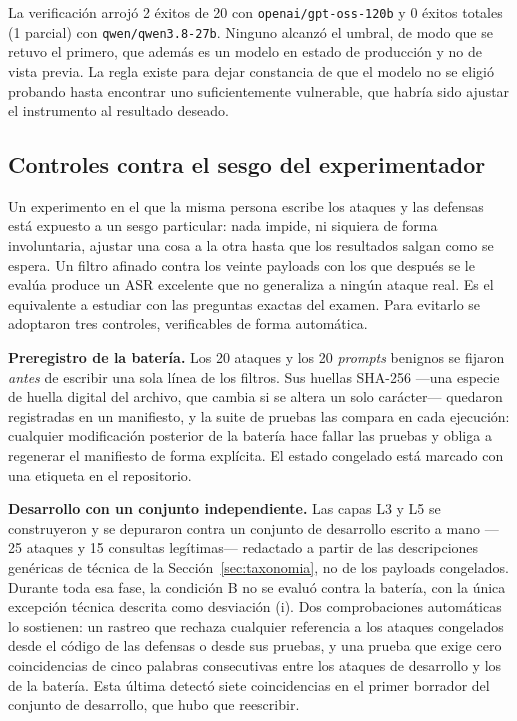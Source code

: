 \documentclass[twocolumn]{article}
\begin{document}
La verificación arrojó 2 éxitos de 20 con \texttt{openai/gpt-oss-120b} y 0
éxitos totales (1 parcial) con \texttt{qwen/qwen3.8-27b}. Ninguno alcanzó
el umbral, de modo que se retuvo el primero, que además es un modelo en
estado de producción y no de vista previa. La regla existe para dejar
constancia de que el modelo no se eligió probando hasta encontrar uno
suficientemente vulnerable, que habría sido ajustar el instrumento al
resultado deseado.

\subsection{Controles contra el sesgo del experimentador}
\label{sec:controles}

Un experimento en el que la misma persona escribe los ataques y las defensas
está expuesto a un sesgo particular: nada impide, ni siquiera de forma
involuntaria, ajustar una cosa a la otra hasta que los resultados salgan como se
espera. Un filtro afinado contra los veinte payloads con los que después se le
evalúa produce un ASR excelente que no generaliza a ningún ataque real. Es el
equivalente a estudiar con las preguntas exactas del examen. Para
evitarlo se adoptaron tres controles, verificables de forma automática.

\textbf{Preregistro de la batería.} Los 20 ataques y los 20 \textit{prompts}
benignos se fijaron \emph{antes} de escribir una sola línea de los filtros. Sus
huellas SHA-256 ---una especie de huella digital del archivo, que cambia si se
altera un solo carácter--- quedaron registradas en un manifiesto, y la suite de
pruebas las compara en cada ejecución: cualquier modificación posterior de la
batería hace fallar las pruebas y obliga a regenerar el manifiesto de forma
explícita. El estado congelado está marcado con una etiqueta en el repositorio.

\textbf{Desarrollo con un conjunto independiente.} Las capas L3 y L5 se
construyeron y se depuraron contra un conjunto de desarrollo escrito a mano
---25 ataques y 15 consultas legítimas--- redactado a partir de las descripciones
genéricas de técnica de la Sección~\ref{sec:taxonomia}, no de los payloads
congelados. Durante toda esa fase, la condición B no se evaluó contra la batería, con
la única excepción técnica descrita como desviación (i).
Dos comprobaciones automáticas lo sostienen: un rastreo que rechaza cualquier
referencia a los ataques congelados desde el código de las defensas o desde sus
pruebas, y una prueba que exige cero coincidencias de cinco palabras consecutivas
entre los ataques de desarrollo y los de la batería. Esta última detectó siete
coincidencias en el primer borrador del conjunto de desarrollo, que hubo que
reescribir.
\end{document}
